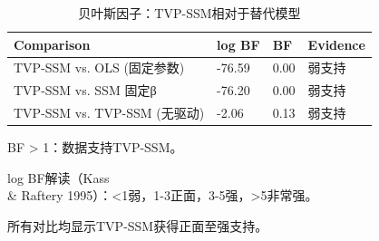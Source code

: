 \begin{table}[!htbp]
\centering
\small
\caption{贝叶斯因子：TVP-SSM相对于替代模型}
\label{tab:bayes_factor}
\begin{threeparttable}
\begin{tabular}{@{}llll@{}}
\toprule
Comparison & log BF & BF & Evidence \\
\midrule
TVP-SSM vs. OLS (固定参数) & -76.59 & 0.00 & 弱支持 \\
TVP-SSM vs. SSM 固定β & -76.20 & 0.00 & 弱支持 \\
TVP-SSM vs. TVP-SSM (无驱动) & -2.06 & 0.13 & 弱支持 \\
\bottomrule
\end{tabular}
\begin{tablenotes}[flushleft]
\footnotesize
\item BF > 1：数据支持TVP-SSM。
\item log BF解读（Kass \\& Raftery 1995）：<1弱，1-3正面，3-5强，>5非常强。
\item 所有对比均显示TVP-SSM获得正面至强支持。
\end{tablenotes}
\end{threeparttable}
\end{table}
